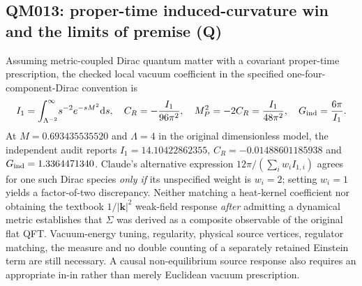 \documentclass[11pt,a4paper]{article}
\begin{document}
\subsection{QM013: proper-time induced-curvature win and the limits of premise (Q)}\label{sec:v08-qm013}
Assuming metric-coupled Dirac quantum matter with a covariant proper-time prescription, the checked local vacuum coefficient in the specified one-four-component-Dirac convention is
\begin{equation}\label{eq:v08-induced-coeff}
I_1=\int_{\Lambda^{-2}}^\infty\!s^{-2}e^{-sM^2}\mathrm d s,
\quad C_R=-\frac{I_1}{96\pi^2},\quad
M_P^2=-2C_R=\frac{I_1}{48\pi^2},\quad G_{\rm ind}=\frac{6\pi}{I_1}.
\end{equation}
At $M=0.693435535520$ and $\Lambda=4$ in the original dimensionless model, the independent audit reports $I_1=14.10422862355$, $C_R=-0.01488601185938$ and $G_{\rm ind}=1.3364471340$. Claude's alternative expression $12\pi/(\sum_i w_iI_{1,i})$ agrees for one such Dirac species \emph{only if} its unspecified weight is $w_i=2$; setting $w_i=1$ yields a factor-of-two discrepancy. Neither matching a heat-kernel coefficient nor obtaining the textbook $1/|\bm k|^2$ weak-field response \emph{after} admitting a dynamical metric establishes that $\Sigma$ was derived as a composite observable of the original flat QFT. Vacuum-energy tuning, regularity, physical source vertices, regulator matching, the measure and no double counting of a separately retained Einstein term are still necessary. A causal non-equilibrium source response also requires an appropriate in-in rather than merely Euclidean vacuum prescription.
\end{document}
